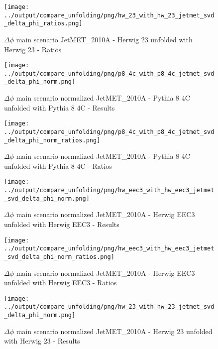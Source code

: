 \documentclass[11pt]{book}
\begin{document}
\begin{figure}[ht]
\centering
\texttt{[image: ../output/compare\_unfolding/png/hw\_23\_with\_hw\_23\_jetmet\_svd\_delta\_phi\_ratios.png]}
\caption{$\Delta\phi$ main scenario JetMET\_2010A - Herwig 23 unfolded with Herwig 23 - Ratios}
\label{hw_23_jetmet_svd_delta_phi_b}
\end{figure}


\begin{figure}[ht]
\centering
\texttt{[image: ../output/compare\_unfolding/png/p8\_4c\_with\_p8\_4c\_jetmet\_svd\_delta\_phi\_norm.png]}
\caption{$\Delta\phi$ main scenario normalized JetMET\_2010A - Pythia 8 4C unfolded with Pythia 8 4C - Results}
\label{p8_p8_jetmet_svd_delta_phi_norm_a}
\end{figure}

\begin{figure}[ht]
\centering
\texttt{[image: ../output/compare\_unfolding/png/p8\_4c\_with\_p8\_4c\_jetmet\_svd\_delta\_phi\_norm\_ratios.png]}
\caption{$\Delta\phi$ main scenario normalized JetMET\_2010A - Pythia 8 4C unfolded with Pythia 8 4C - Ratios}
\label{p8_p8_jetmet_svd_delta_phi_norm_b}
\end{figure}

\begin{figure}[ht]
\centering
\texttt{[image: ../output/compare\_unfolding/png/hw\_eec3\_with\_hw\_eec3\_jetmet\_svd\_delta\_phi\_norm.png]}
\caption{$\Delta\phi$ main scenario normalized JetMET\_2010A - Herwig EEC3 unfolded with Herwig EEC3 - Results}
\label{hw_eec3_hw_eec3_jetmet_svd_delta_phi_norm_a}
\end{figure}

\begin{figure}[ht]
\centering
\texttt{[image: ../output/compare\_unfolding/png/hw\_eec3\_with\_hw\_eec3\_jetmet\_svd\_delta\_phi\_norm\_ratios.png]}
\caption{$\Delta\phi$ main scenario normalized JetMET\_2010A - Herwig EEC3 unfolded with Herwig EEC3 - Ratios}
\label{hw_eec3_jetmet_svd_delta_phi_norm_b}
\end{figure}

\begin{figure}[ht]
\centering
\texttt{[image: ../output/compare\_unfolding/png/hw\_23\_with\_hw\_23\_jetmet\_svd\_delta\_phi\_norm.png]}
\caption{$\Delta\phi$ main scenario normalized JetMET\_2010A - Herwig 23 unfolded with Herwig 23 - Results}
\label{hw_23_hw_23_jetmet_svd_delta_phi_norm_a}
\end{figure}
\end{document}
